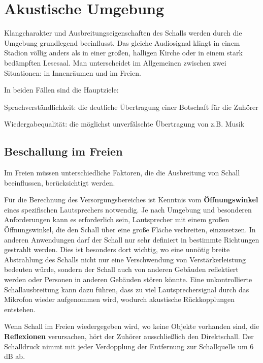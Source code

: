 \section{Akustische Umgebung}
\label{sec:Akustische Umgebung}
Klangcharakter und Ausbreitungseigenschaften des Schalls werden durch die Umgebung grundlegend beeinflusst. Das gleiche Audiosignal klingt in einem Stadion völlig anders als in einer großen, halligen Kirche oder in einem stark bedämpften Lesesaal. Man unterscheidet im Allgemeinen zwischen zwei Situationen: in Innenräumen und im Freien.

In beiden Fällen sind die Hauptziele:
\begin{compactenum}
\item Sprachverständlichkeit: die deutliche Übertragung einer Botschaft für die Zuhörer
\item Wiedergabequalität: die möglichst unverfälschte Übertragung von z.B. Musik 
\end{compactenum}

\subsection{Beschallung im Freien}
\label{sub:Beschallung im Freien}
Im Freien müssen unterschiedliche Faktoren, die die Ausbreitung von Schall beeinflussen, berücksichtigt werden.

Für die Berechnung des Versorgungsbereiches ist Kenntnis vom \textbf{Öffnungswinkel} eines spezifischen Lautsprechers notwendig. Je nach Umgebung und besonderen Anforderungen kann es erforderlich sein, Lautsprecher mit einem großen Öffnungswinkel, die den Schall über eine große Fläche verbreiten, einzusetzen. In anderen Anwendungen darf der Schall nur sehr definiert in bestimmte Richtungen gestrahlt werden. Dies ist besonders dort wichtig, wo eine unnötig breite Abstrahlung des Schalls nicht nur eine Verschwendung von Verstärkerleistung bedeuten würde, sondern der Schall auch von anderen Gebäuden reflektiert werden oder Personen in anderen Gebäuden stören könnte. Eine unkontrollierte Schallausbreitung kann dazu führen, dass zu viel Lautsprechersignal durch das Mikrofon wieder aufgenommen wird, wodurch akustische Rückkopplungen entstehen.

Wenn Schall im Freien wiedergegeben wird, wo keine Objekte vorhanden sind, die \textbf{Reflexionen} verursachen, hört der Zuhörer ausschließlich den Direktschall. Der Schalldruck nimmt mit jeder Verdopplung der Entfernung zur Schallquelle um 6 dB ab.

